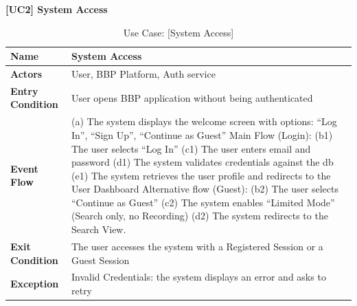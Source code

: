 \begin{table}[H]
    \centering
    \raggedright \textbf{\large [UC2] System Access} \\[0.2cm]

    \renewcommand{\arraystretch}{1.5}
    \begin{tabularx}{\textwidth}{|l|X|}
        \hline
        \textbf{Name} & \textbf{System Access} \\ \hline
        \textbf{Actors} & User, BBP Platform, Auth service \\ \hline
        \textbf{Entry Condition} & User opens BBP application without being authenticated \\ \hline
        \textbf{Event Flow} & 
        (a) The system displays the welcome screen with options: “Log In”, “Sign Up”, “Continue as Guest” \newline \newline
        Main Flow (Login): \newline
        (b1) The user selects “Log In” \newline
        (c1) The user enters email and password \newline
        (d1) The system validates credentials against the db \newline
        (e1) The system retrieves the user profile and redirects to the User Dashboard \newline \newline
        Alternative flow (Guest): \newline
        (b2) The user selects ``Continue as Guest'' \newline
        (c2) The system enables ``Limited Mode'' (Search only, no Recording) \newline
        (d2) The system redirects to the Search View.
        \\ \hline
        \textbf{Exit Condition} & The user accesses the system with a Registered Session or a Guest Session \\ \hline
        \textbf{Exception} & Invalid Credentials: the system displays an error and asks to retry \\ \hline
    \end{tabularx}
    \caption{Use Case: [System Access]}
    \label{tab:uc2_system_access}
\end{table}


